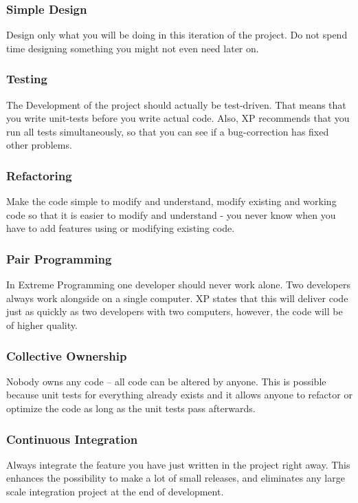 \subsubsection{Simple Design}
Design only what you will be doing in this iteration of the project. Do not spend time designing something you might not even need later on.

\subsubsection{Testing}
The Development of the project should actually be test-driven.
That means that you write unit-tests before you write actual code.
Also, XP recommends that you run all tests simultaneously, so that you can see if a bug-correction has fixed other problems.

\subsubsection{Refactoring}
Make the code simple to modify and understand, modify existing and working code so that it is easier to modify and understand - you never know when you have to add features using or modifying existing code.

\subsubsection{Pair Programming}
In Extreme Programming one developer should never work alone. Two developers always work alongside on a single computer. XP states that this will deliver code just as quickly as two developers with two computers, however, the code will be of higher quality.

\subsubsection{Collective Ownership}
Nobody owns any code -- all code can be altered by anyone.
This is possible because unit tests for everything already exists and it allows anyone to refactor or optimize the code as long as the unit tests pass afterwards.

\subsubsection{Continuous Integration}
Always integrate the feature you have just written in the project right away.
This enhances the possibility to make a lot of small releases, and eliminates any large scale integration project at the end of development.


